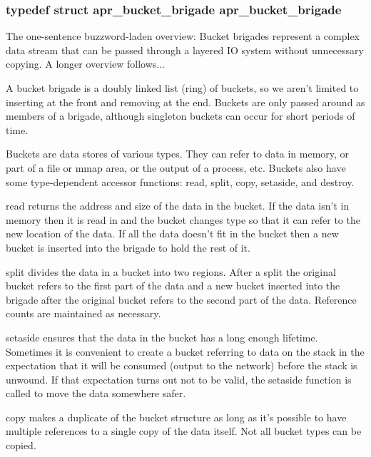 \hypertarget{group___a_p_r___util___bucket___brigades_ga9f50254e85c7aad79ca289a0ba069025}{
\subsubsection[{apr\-\_\-bucket\-\_\-brigade}]{\setlength{\rightskip}{0pt plus 5cm}typedef struct {\bf apr\-\_\-bucket\-\_\-brigade} {\bf apr\-\_\-bucket\-\_\-brigade}}}\label{group___a_p_r___util___bucket___brigades_ga9f50254e85c7aad79ca289a0ba069025}
The one-\/sentence buzzword-\/laden overview\-: Bucket brigades represent a complex data stream that can be passed through a layered I\-O system without unnecessary copying. A longer overview follows...

A bucket brigade is a doubly linked list (ring) of buckets, so we aren't limited to inserting at the front and removing at the end. Buckets are only passed around as members of a brigade, although singleton buckets can occur for short periods of time.

Buckets are data stores of various types. They can refer to data in memory, or part of a file or mmap area, or the output of a process, etc. Buckets also have some type-\/dependent accessor functions\-: read, split, copy, setaside, and destroy.

read returns the address and size of the data in the bucket. If the data isn't in memory then it is read in and the bucket changes type so that it can refer to the new location of the data. If all the data doesn't fit in the bucket then a new bucket is inserted into the brigade to hold the rest of it.

split divides the data in a bucket into two regions. After a split the original bucket refers to the first part of the data and a new bucket inserted into the brigade after the original bucket refers to the second part of the data. Reference counts are maintained as necessary.

setaside ensures that the data in the bucket has a long enough lifetime. Sometimes it is convenient to create a bucket referring to data on the stack in the expectation that it will be consumed (output to the network) before the stack is unwound. If that expectation turns out not to be valid, the setaside function is called to move the data somewhere safer.

copy makes a duplicate of the bucket structure as long as it's possible to have multiple references to a single copy of the data itself. Not all bucket types can be copied.


